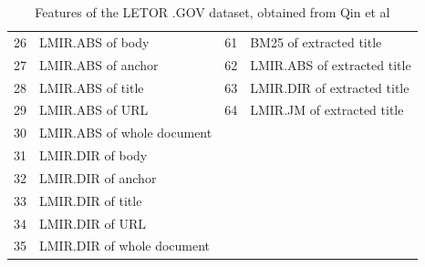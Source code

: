 \begin{table}[!h]
{\begin{tabular}{p{0.29cm}|p{7.26cm}||p{0.29cm}|p{9.55cm}}
26& LMIR.ABS \cite{Zhai2001} of body	& 61& BM25 of extracted title\\
27& LMIR.ABS of anchor				& 62& LMIR.ABS of extracted title\\
28& LMIR.ABS of title				& 63& LMIR.DIR of extracted title\\
29& LMIR.ABS of \ac{URL}			& 64& LMIR.JM of extracted title\\
30& LMIR.ABS of whole document\\

31& LMIR.DIR of body\\
32& LMIR.DIR of anchor\\
33& LMIR.DIR of title\\
34& LMIR.DIR of \ac{URL}\\
35& LMIR.DIR of whole document\\
\end{tabular}
}
\caption{Features of the LETOR .GOV dataset, obtained from Qin et al \cite{Qin2010}}
\label{tbl:features_gov}
\end{table}

